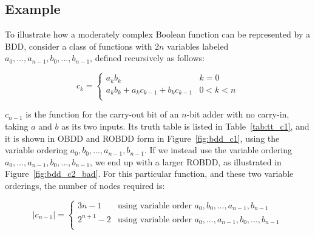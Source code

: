 \documentclass[a4paper,11pt]{kth-mag}
\begin{document}
\subsection{Example}

To illustrate how a moderately complex Boolean function can be represented by a BDD, consider a class of functions with $2n$ variables labeled $a_0,...,a_{n-1},b_0,...,b_{n-1}$, defined recursively as follows:

$$
  c_k = \left\{
  \begin{array}{ll}
    a_k b_k                             & k = 0 \\
    a_k b_k + a_k c_{k-1} + b_k c_{k-1} & 0 < k < n \\
  \end{array}\right.
$$

$c_{n-1}$ is the function for the carry-out bit of an $n$-bit adder with no carry-in, taking $a$ and $b$ as its two inputs.
Its truth table is listed in Table~\ref{tab:tt_c1}, and it is shown in OBDD and ROBDD form in Figure~\ref{fig:bdd_c1}, using the variable ordering $a_0,b_0,...,a_{n-1},b_{n-1}$.
If we instead use the variable ordering $a_0,...,a_{n-1},b_0,...,b_{n-1}$, we end up with a larger ROBDD, as illustrated in Figure~\ref{fig:bdd_c2_bad}.
For this particular function, and these two variable orderings, the number of nodes required is:

$$
  |c_{n-1}| = \left\{
  \begin{array}{ll}
    3n-1      & \textrm{using variable order $a_0,b_0,...,a_{n-1},b_{n-1}$} \\
    2^{n+1}-2 & \textrm{using variable order $a_0,...,a_{n-1},b_0,...,b_{n-1}$} \\
  \end{array}\right.
$$
\end{document}

